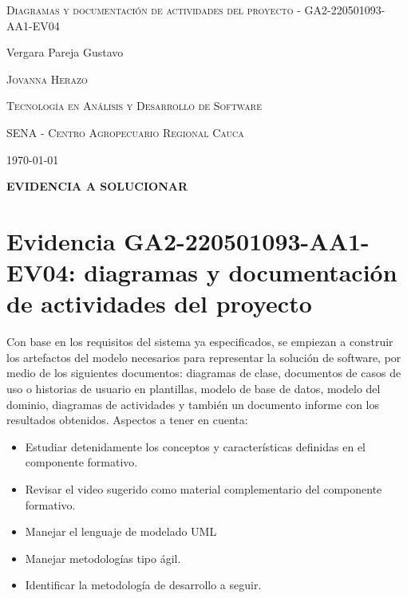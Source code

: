 \documentclass{article}
\author{Gustavo Vergara}
\theoremstyle{mytheoremstyle}
\theoremstyle{mytheoremstyle}
\theoremstyle{myproblemstyle}
\begin{document}
\pgfplotsset{compat=1.18}

\begin{titlepage}
	\centering
	\vspace{2.5cm}
	{\scshape \Large Diagramas y documentación de actividades del proyecto - GA2-220501093-AA1-EV04 \par}
	\vspace{5cm}
	\textbf\large\scshape{\par}
	\vspace{0.5cm}

	{\Large Vergara Pareja Gustavo\par}
	\vspace{5cm}
	{\scshape\Large Jovanna Herazo\par}
	\vspace{0.3cm}
	{\scshape\Large Tecnología en Análisis y Desarrollo de Software \par}
	\vspace{0.3cm}
	{\scshape\Large SENA - Centro Agropecuario Regional Cauca\par}
	\vspace{0.3cm}
	{\Large \today \par}
\end{titlepage}

\begin{flushleft}
	\large \textbf{EVIDENCIA A SOLUCIONAR}\\
	\vspace{0.1cm}
	\section*{Evidencia GA2-220501093-AA1-EV04: diagramas y documentación de actividades del proyecto}
	Con base en los requisitos del sistema ya especificados, se empiezan a construir los artefactos del modelo necesarios para representar la solución de software, por medio de los siguientes documentos: diagramas de clase, documentos de casos de uso o historias de usuario en plantillas, modelo de base de datos, modelo del dominio, diagramas de actividades y también un documento informe con los resultados obtenidos. Aspectos a tener en cuenta:
	\begin{itemize}
		\item Estudiar detenidamente los conceptos y características definidas en el
		      componente formativo.
		\item Revisar el video sugerido como material complementario del componente
		      formativo.
		\item Manejar el lenguaje de modelado UML
		\item Manejar metodologías tipo ágil.
		\item Identificar la metodología de desarrollo a seguir.
	\end{itemize}
\end{flushleft}
\newpage
\end{document}
